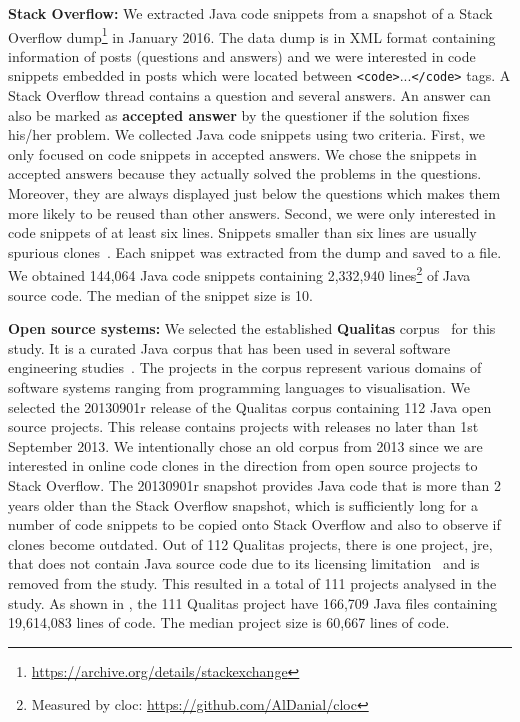 \documentclass[sigconf,review, anonymous]{acmart}
\begin{document}
\textbf{Stack Overflow:} 
We extracted Java code snippets from a snapshot of a Stack Overflow
dump\footnote{\url{https://archive.org/details/stackexchange}} in
January 2016. 
The data
dump is in XML format containing information of posts
(questions and answers) and 
we were interested in code snippets embedded
in posts which were located between
{\small\texttt{<code>}...\texttt{</code>}} tags. A Stack Overflow
thread contains a question and several answers. An answer can also be
marked as \textbf{accepted answer} by the questioner if the solution
fixes his/her problem. We collected Java code snippets using two
criteria. First, we only focused on code snippets in accepted
answers. We chose the snippets in accepted answers because they
actually solved the problems in the questions. Moreover, they are
always displayed just below the questions which makes them more
likely to be reused than other answers. Second, we were only
interested in code snippets of at least six lines. Snippets smaller
than six lines are usually spurious clones~\cite{Bellon2007}. Each
snippet was extracted from the dump and saved to a file.
We obtained 144,064 Java code snippets containing 2,332,940
lines\footnote{Measured by cloc:
  \url{https://github.com/AlDanial/cloc}} of Java source code.
The median of the snippet size is 10.

\textbf{Open source systems: }
We selected the established \textbf{Qualitas} corpus~\cite{QualitasCorpus} 
for this study. It is a curated Java corpus that has been used in several
software engineering
studies~\cite{Taube-Schock2011,Beckman2011,Vasilescu2011,Omar2012}. The
projects in the corpus represent various domains of software systems
ranging from programming languages to
visualisation. We selected the 20130901r release
of the Qualitas corpus containing 112 Java open source projects. This
release contains projects with releases no later than 1st September
2013. We intentionally chose an old corpus from 2013 since we are interested in
online code clones in the direction from open source projects to Stack
Overflow. The 20130901r snapshot provides Java code that is more than
2 years older than the Stack Overflow snapshot, which is sufficiently
long for a number of code snippets to be copied onto Stack Overflow
and also to observe if clones become outdated. Out of 112 Qualitas
projects, there is one project, \textsf{jre}, that does not contain
Java source code due to its licensing limitation~\cite{QualitasCorpus}
and is removed from the study. This resulted in a total of 111
projects analysed in the study. As shown in , the
111 Qualitas project have 166,709 Java files containing 19,614,083
lines of code. The median project size is 60,667 lines of code.
\end{document}
